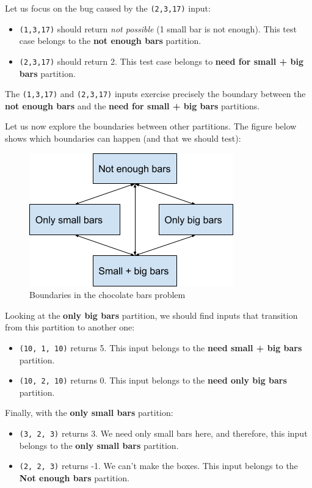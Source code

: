 Let us focus on the bug caused by the \texttt{(2,3,17)} input:

\begin{itemize}
\tightlist
\item
  \texttt{(1,3,17)} should return \emph{not possible} (1 small bar is
  not enough). This test case belongs to the \textbf{not enough bars}
  partition.
\item
  \texttt{(2,3,17)} should return 2. This test case belongs to
  \textbf{need for small + big bars} partition.
\end{itemize}

The \texttt{(1,3,17)} and \texttt{(2,3,17)} inputs exercise precisely
the boundary between the \textbf{not enough bars} and the \textbf{need
for small + big bars} partitions.

Let us now explore the boundaries between other partitions. The figure
below shows which boundaries can happen (and that we should test):

\begin{figure}
\centering
\includegraphics{img/boundary-testing/chocolate-boundaries.png}
\caption{Boundaries in the chocolate bars problem}
\end{figure}

Looking at the \textbf{only big bars} partition, we should find inputs
that transition from this partition to another one:

\begin{itemize}
\tightlist
\item
  \texttt{(10,\ 1,\ 10)} returns 5. This input belongs to the
  \textbf{need small + big bars} partition.
\item
  \texttt{(10,\ 2,\ 10)} returns 0. This input belongs to the
  \textbf{need only big bars} partition.
\end{itemize}

Finally, with the \textbf{only small bars} partition:

\begin{itemize}
\tightlist
\item
  \texttt{(3,\ 2,\ 3)} returns 3. We need only small bars here, and
  therefore, this input belongs to the \textbf{only small bars}
  partition.
\item
  \texttt{(2,\ 2,\ 3)} returns -1. We can't make the boxes. This input
  belongs to the \textbf{Not enough bars} partition.
\end{itemize}

